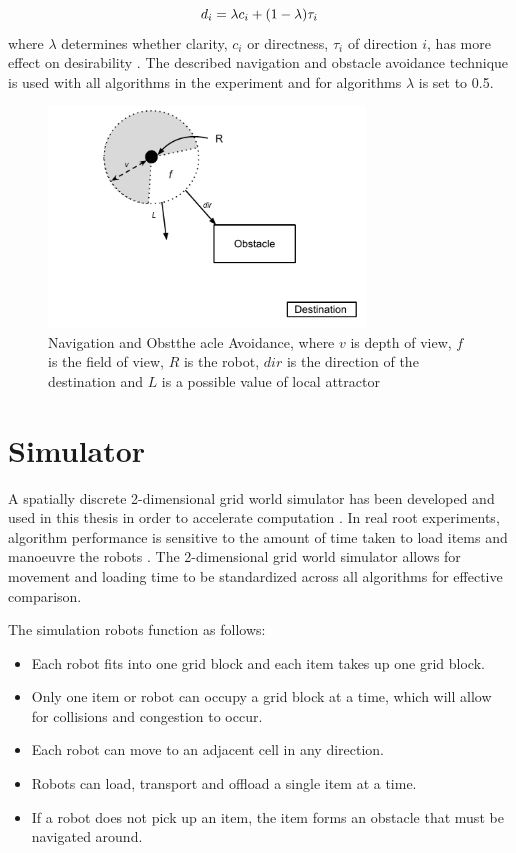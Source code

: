 \begin{equation}
	d_i= \lambda c_i + (1 - \lambda)\tau_i \\
	\label{eq:1}
\end{equation} where $\lambda$ determines whether clarity, $c_i$ or directness, $\tau_i$ of direction $i$, has more effect on desirability
. The described navigation and obstacle avoidance technique is used with all algorithms in the experiment and for algorithms $\lambda$ is set to 0.5.

\begin{figure}
	\centering
	\includegraphics[width=0.75\textwidth]{chapters/chapter5/figures/ObstacleAvoidance.pdf}
	\caption{Navigation and Obstthe acle Avoidance, where $v$ is depth of view, $f$ is the field of view, $R$ is the robot, $dir$ is the direction of the destination and $L$ is a possible value of local attractor}
	\label{fig:obstacleavoidance}
\end{figure}


\section{Simulator}
\label{simulator}
A spatially discrete 2-dimensional grid world simulator has been developed and used in this thesis in order to accelerate computation \cite{sugawara2002swarming}. In real root experiments, algorithm performance is sensitive to the amount of time taken to load items and manoeuvre the robots \cite{ostergaard2001emergent}. The 2-dimensional grid world simulator allows for movement and loading time to be standardized across all algorithms for effective comparison.

The simulation robots function as follows:
\begin{itemize}
	\item Each robot fits into one grid block and each item takes up one grid block. 
	\item Only one item or robot can occupy a grid block at a time, which will allow for collisions and congestion to occur. 
	\item Each robot can move to an adjacent cell in any direction.
	\item Robots can load, transport and offload a single item at a time.
	\item If a robot does not pick up an item, the item forms an obstacle that must be navigated around.
\end{itemize}

